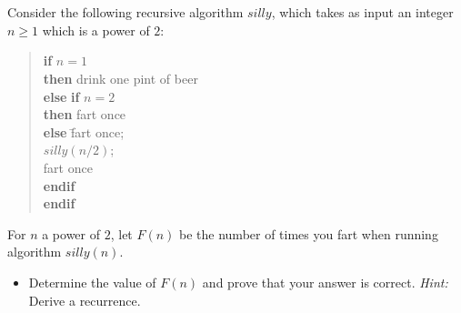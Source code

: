 \documentclass[12pt]{article}
\begin{document}
\begin{question}\\ \\
Consider the following recursive algorithm $silly$, which takes as 
input an integer $n \geq 1$ which is a power of $2$:

\begin{quote}
\begin{tabbing}
{\bf if} $n=1$ \\
{\bf then} drink one pint of beer \\
{\bf else} \= {\bf if} $n=2$ \\
           \> {\bf then} fart once \\
           \> {\bf else} \= fart once; \\
           \>            \> $silly(n/2)$; \\
           \>            \> fart once \\
           \> {\bf endif} \\
{\bf endif}
\end{tabbing}
\end{quote}

For $n$ a power of $2$, let $F(n)$ be the number of times you fart when
running algorithm $silly(n)$. 
\end{question}
\begin{itemize}
\item Determine the value of $F(n)$ and prove that your answer is correct. 
      \emph{Hint:} Derive a recurrence. 
\end{itemize} 
\end{document}
